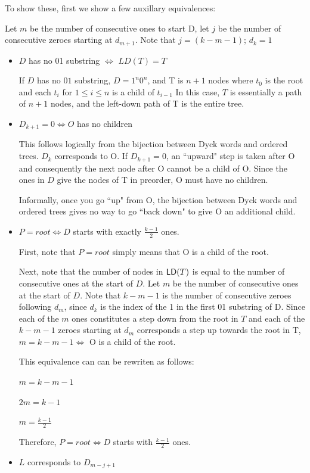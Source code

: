 To show these, first we show a few auxillary equivalences:

Let $m$ be the number of consecutive ones to start D, let $j$ be the number of consecutive zeroes starting at $d_{m+1}$.  Note that $j=(k-m-1)$; $d_{k}=1$
\begin{itemize}
    \item $D$ has no 01 substring $\iff$ $LD(T)=T$


	If $D$ has no $01$ substring, $D=1^n0^n$, and T is $n+1$ nodes where $t_0$ is the root and each $t_i$ for $1\le i \le n$ is a child of $t_{i-1}$  In this case, $T$ is essentially a path of $n+1$ nodes, and the left-down path of T is the entire tree.
    \item $D_{k+1} = 0 \iff O$ has no children

	This follows logically from the bijection between Dyck words and ordered trees.  $D_k$ corresponds to O.  If $D_{k+1}=0$, an ``upward" step is taken after O and consequently the next node after O cannot be a child of O.  Since the ones in $D$ give the nodes of T in preorder, O must have no children.

	Informally, once you go ``up" from O, the bijection between Dyck words and ordered trees gives no way to go ``back down" to give O an additional child.
    \item $P=root \iff D$ starts with exactly $\frac{k-1}{2}$ ones.

	First, note that $P=root$ simply means that O is a child of the root.

	Next, note that the number of nodes in $\mathsf{LD}{(T)}$ is equal to the number of consecutive ones at the start of $D$.  Let $m$ be the number of consecutive ones at the start of $D$.  Note that $k-m-1$ is the number of consecutive zeroes following $d_m$, since $d_k$ is the index of the 1 in the first 01 substring of D. Since each of the $m$ ones constitutes a step down from the root in $T$ and each of the $k-m-1$ zeroes starting at $d_m$ corresponds a step up towards the root in T, $m=k-m-1 \iff $ O is a child of the root. 

	This equivalence can can be rewriten as follows: 

	$m=k-m-1$

	$2m=k-1$

	$m=\frac{k-1}{2}$


	Therefore, $P=root \iff D$  starts with $\frac{k-1}{2}$ ones.

    \item $L$ corresponds to $D_{m-j+1}$

	
\end{itemize}
